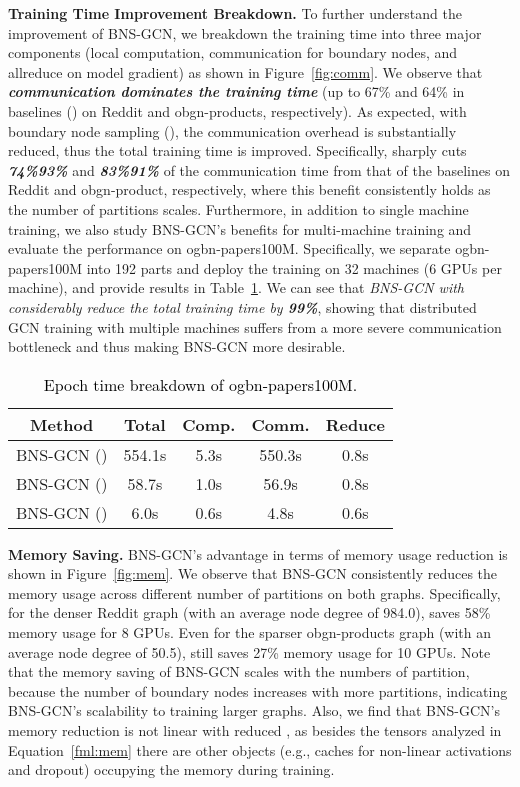 \documentclass{article}
\newcommand{\niparagraph}[1]{\noindent\textbf{#1}}
\begin{document}
\niparagraph{Training Time Improvement Breakdown.} 
To further understand the improvement of BNS-GCN, we breakdown the training time into three major components (local computation, communication for boundary nodes, and allreduce on model gradient) as shown in Figure~\ref{fig:comm}.
We observe that \textit{\textbf{communication dominates the training time}} (up to 67\% and 64\% in baselines () on Reddit and obgn-products, respectively). 
As expected, with boundary node sampling (), the communication overhead is substantially reduced, thus the total training time is improved. 
Specifically,  sharply cuts \textbf{\textit{74\%93\%}} and \textbf{\textit{83\%91\%}} of the communication time from that of the baselines on Reddit and obgn-product, respectively, where this benefit consistently holds as the number of partitions scales.
Furthermore, in addition to single machine training, we also study BNS-GCN's benefits for multi-machine training and evaluate the performance on ogbn-papers100M. 
Specifically, 
we separate ogbn-papers100M into 192 parts and deploy the training on 32 machines (6 GPUs per machine), and provide results in Table~\ref{tab:papers100m}. We can see that
\textit{BNS-GCN with  considerably reduce the total training time by \textbf{99\%}}, showing that distributed GCN training with multiple machines suffers from a more severe communication bottleneck and thus making BNS-GCN more desirable.

\begin{table}[t]
\centering
\caption{\textcolor{black}{Epoch time breakdown of ogbn-papers100M.
}}
\setlength{\tabcolsep}{0.3em}
\label{tab:papers100m}
\begin{tabular}{c|cccc}
\hline
Method & Total & Comp. & Comm. & Reduce \\ \hline
BNS-GCN () & 554.1s & 5.3s & 550.3s & 0.8s \\
BNS-GCN () & 58.7s & 1.0s & 56.9s & 0.8s \\
BNS-GCN () & 6.0s & 0.6s & 4.8s & 0.6s \\
\hline
\end{tabular}
\end{table}

\niparagraph{Memory Saving.} 
BNS-GCN's advantage in terms of memory usage reduction is shown in Figure~\ref{fig:mem}.
We observe that BNS-GCN consistently reduces the memory usage across different number of partitions on both graphs. 
Specifically, for the denser Reddit graph (with an average node degree of 984.0),  saves 58\% memory usage for 8 GPUs. 
Even for the sparser obgn-products graph (with an average node degree of 50.5),  still saves 27\% memory usage for 10 GPUs. 
Note that the memory saving of BNS-GCN scales with the numbers of partition, because the number of boundary nodes increases with more partitions, indicating BNS-GCN's scalability to training larger graphs.
Also, we find that BNS-GCN's memory reduction is not linear with reduced , as besides the tensors analyzed in Equation~\ref{fml:mem} there are other objects (e.g., caches for non-linear activations and dropout) occupying the memory during training.
\end{document}
